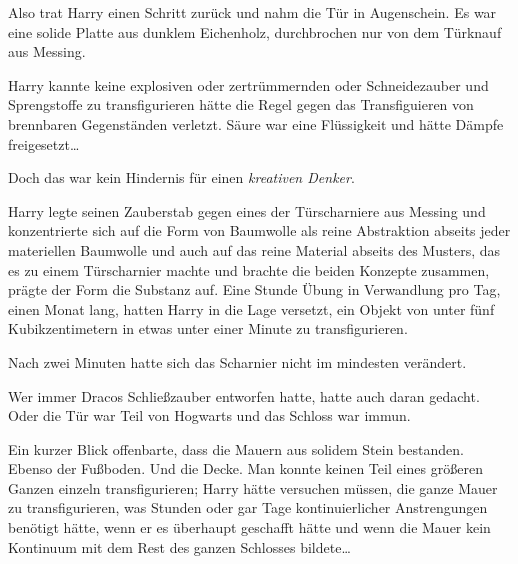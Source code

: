 Also trat Harry einen Schritt zurück und nahm die Tür in Augenschein. Es war eine solide Platte aus dunklem Eichenholz, durchbrochen nur von dem Türknauf aus Messing.

Harry kannte keine explosiven oder zertrümmernden oder Schneidezauber und Sprengstoffe zu transfigurieren hätte die Regel gegen das Transfiguieren von brennbaren Gegenständen verletzt. Säure war eine Flüssigkeit und hätte Dämpfe freigesetzt…

Doch das war kein Hindernis für einen \emph{kreativen Denker}.

Harry legte seinen Zauberstab gegen eines der Türscharniere aus Messing und konzentrierte sich auf die Form von Baumwolle als reine Abstraktion abseits jeder materiellen Baumwolle und auch auf das reine Material abseits des Musters, das es zu einem Türscharnier machte und brachte die beiden Konzepte zusammen, prägte der Form die Substanz auf. Eine Stunde Übung in Verwandlung pro Tag, einen Monat lang, hatten Harry in die Lage versetzt, ein Objekt von unter fünf Kubikzentimetern in etwas unter einer Minute zu transfigurieren.

Nach zwei Minuten hatte sich das Scharnier nicht im mindesten verändert.

Wer immer Dracos Schließzauber entworfen hatte, hatte auch daran gedacht. Oder die Tür war Teil von Hogwarts und das Schloss war immun.

Ein kurzer Blick offenbarte, dass die Mauern aus solidem Stein bestanden. Ebenso der Fußboden. Und die Decke. Man konnte keinen Teil eines größeren Ganzen einzeln transfigurieren; Harry hätte versuchen müssen, die ganze Mauer zu transfigurieren, was Stunden oder gar Tage kontinuierlicher Anstrengungen benötigt hätte, wenn er es überhaupt geschafft hätte und wenn die Mauer kein Kontinuum mit dem Rest des ganzen Schlosses bildete…


